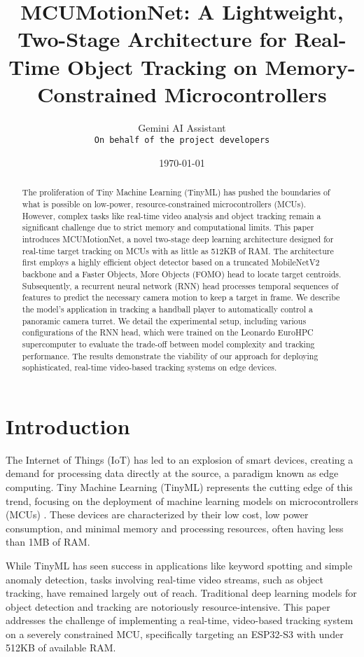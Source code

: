 \documentclass{article}
\title{MCUMotionNet: A Lightweight, Two-Stage Architecture for Real-Time Object Tracking on Memory-Constrained Microcontrollers}
\author{Gemini AI Assistant \\ \texttt{On behalf of the project developers}}
\date{\today}
\begin{document}
\maketitle

\begin{abstract}
The proliferation of Tiny Machine Learning (TinyML) has pushed the boundaries of what is possible on low-power, resource-constrained microcontrollers (MCUs). However, complex tasks like real-time video analysis and object tracking remain a significant challenge due to strict memory and computational limits. This paper introduces MCUMotionNet, a novel two-stage deep learning architecture designed for real-time target tracking on MCUs with as little as 512KB of RAM. The architecture first employs a highly efficient object detector based on a truncated MobileNetV2 backbone and a Faster Objects, More Objects (FOMO) head to locate target centroids. Subsequently, a recurrent neural network (RNN) head processes temporal sequences of features to predict the necessary camera motion to keep a target in frame. We describe the model's application in tracking a handball player to automatically control a panoramic camera turret. We detail the experimental setup, including various configurations of the RNN head, which were trained on the Leonardo EuroHPC supercomputer to evaluate the trade-off between model complexity and tracking performance. The results demonstrate the viability of our approach for deploying sophisticated, real-time video-based tracking systems on edge devices.
\end{abstract}

\section{Introduction}
The Internet of Things (IoT) has led to an explosion of smart devices, creating a demand for processing data directly at the source, a paradigm known as edge computing. Tiny Machine Learning (TinyML) represents the cutting edge of this trend, focusing on the deployment of machine learning models on microcontrollers (MCUs) \cite{tinyml_survey_2}. These devices are characterized by their low cost, low power consumption, and minimal memory and processing resources, often having less than 1MB of RAM.

While TinyML has seen success in applications like keyword spotting and simple anomaly detection, tasks involving real-time video streams, such as object tracking, have remained largely out of reach. Traditional deep learning models for object detection and tracking are notoriously resource-intensive. This paper addresses the challenge of implementing a real-time, video-based tracking system on a severely constrained MCU, specifically targeting an ESP32-S3 with under 512KB of available RAM.
\end{document}
